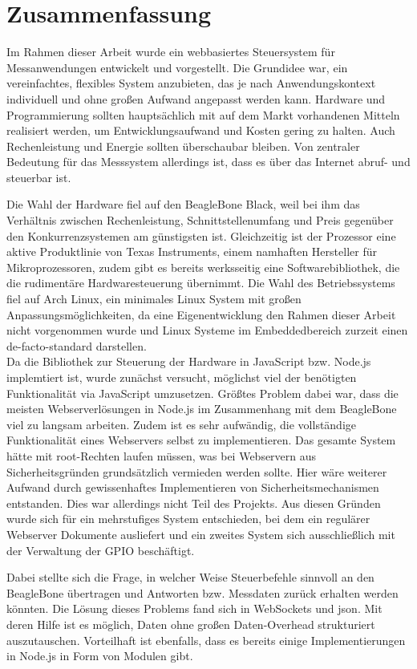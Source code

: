 \chapter{Zusammenfassung}
Im Rahmen dieser Arbeit wurde ein webbasiertes Steuersystem für Messanwendungen entwickelt und vorgestellt. Die Grundidee war, ein vereinfachtes, flexibles System anzubieten, das je nach Anwendungskontext individuell und ohne großen Aufwand angepasst werden kann. Hardware und Programmierung sollten hauptsächlich mit auf dem Markt vorhandenen Mitteln realisiert werden, um Entwicklungsaufwand und Kosten gering zu halten. Auch Rechenleistung und Energie sollten überschaubar bleiben. Von zentraler Bedeutung für das Messsystem allerdings ist, dass es über das Internet abruf- und steuerbar ist.

Die Wahl der Hardware fiel auf den BeagleBone Black, weil bei ihm das Verhältnis zwischen Rechenleistung, Schnittstellenumfang und Preis gegenüber den Konkurrenzsystemen am günstigsten ist. Gleichzeitig ist der Prozessor eine aktive Produktlinie von Texas Instruments, einem namhaften Hersteller für Mikroprozessoren, zudem gibt es bereits werksseitig eine Softwarebibliothek, die die rudimentäre Hardwaresteuerung übernimmt. Die Wahl des Betriebssystems fiel auf Arch Linux, ein minimales Linux System mit großen Anpassungsmöglichkeiten, da eine Eigenentwicklung den Rahmen dieser Arbeit nicht vorgenommen wurde und Linux Systeme im Embeddedbereich zurzeit einen \gls{de-facto-standard} darstellen.\\

Da die Bibliothek zur Steuerung der Hardware in JavaScript bzw. Node.js implemtiert ist, wurde zunächst versucht, möglichst viel der benötigten Funktionalität via JavaScript umzusetzen. Größtes Problem dabei war, dass die meisten Webserverlösungen in Node.js im Zusammenhang mit dem BeagleBone viel zu langsam arbeiten. Zudem ist es sehr aufwändig,  die vollständige Funktionalität eines Webservers selbst zu implementieren. Das gesamte System hätte mit root-Rechten laufen müssen, was bei Webservern aus Sicherheitsgründen grundsätzlich vermieden werden sollte. Hier wäre weiterer Aufwand durch gewissenhaftes Implementieren von Sicherheitsmechanismen entstanden. Dies war allerdings nicht Teil des Projekts. Aus diesen Gründen wurde sich für ein mehrstufiges System entschieden, bei dem ein regulärer Webserver Dokumente ausliefert und ein zweites System sich ausschließlich mit der Verwaltung der GPIO beschäftigt.

Dabei stellte sich die Frage, in welcher Weise Steuerbefehle sinnvoll an den BeagleBone übertragen und Antworten bzw. Messdaten zurück erhalten werden könnten. Die Lösung dieses Problems fand sich in WebSockets und \gls{json}. Mit deren Hilfe ist es möglich, Daten ohne großen Daten-Overhead strukturiert auszutauschen. Vorteilhaft ist ebenfalls, dass es bereits einige Implementierungen in Node.js in Form von Modulen gibt.\\

